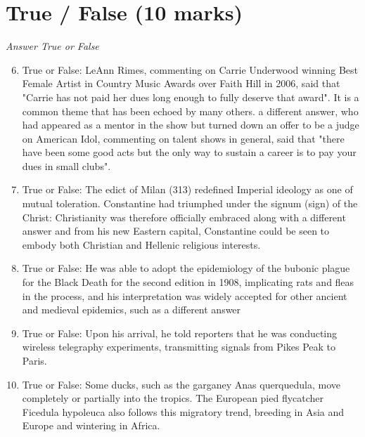 \documentclass[12pt]{article}
\begin{document}
\section*{True / False (10 marks)}
\textit{Answer True or False}
\begin{enumerate}[label=\arabic*.]
\setcounter{enumi}{5}
\item True or False: LeAnn Rimes, commenting on Carrie Underwood winning Best Female Artist in Country Music Awards over Faith Hill in 2006, said that "Carrie has not paid her dues long enough to fully deserve that award". It is a common theme that has been echoed by many others. a different answer, who had appeared as a mentor in the show but turned down an offer to be a judge on American Idol, commenting on talent shows in general, said that "there have been some good acts but the only way to sustain a career is to pay your dues in small clubs".
\item True or False: The edict of Milan (313) redefined Imperial ideology as one of mutual toleration. Constantine had triumphed under the signum (sign) of the Christ: Christianity was therefore officially embraced along with a different answer and from his new Eastern capital, Constantine could be seen to embody both Christian and Hellenic religious interests.
\item True or False: He was able to adopt the epidemiology of the bubonic plague for the Black Death for the second edition in 1908, implicating rats and fleas in the process, and his interpretation was widely accepted for other ancient and medieval epidemics, such as a different answer
\item True or False: Upon his arrival, he told reporters that he was conducting wireless telegraphy experiments, transmitting signals from Pikes Peak to Paris.
\item True or False: Some ducks, such as the garganey Anas querquedula, move completely or partially into the tropics. The European pied flycatcher Ficedula hypoleuca also follows this migratory trend, breeding in Asia and Europe and wintering in Africa.
\end{enumerate}
\end{document}
